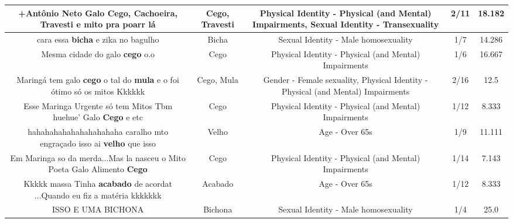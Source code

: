 \documentclass[11pt]{article}
\newlength\mylength
\begin{document}
\begin{center}
\begin{longtable}{|C{.65\mylength}|C{.30\mylength}|C{.12\mylength}|C{.12\mylength}|C{.12\mylength}|}
  \small +Antônio Neto Galo \textbf{Cego}, Cachoeira, \textbf{Travesti} e mito pra poarr lá\normalsize   & Cego, Travesti & Physical Identity - Physical (and Mental) Impairments, Sexual Identity - Transexuality & 2/11 & 18.182 \\  \hline
  \small cara essa \textbf{bicha} e zika no bagulho\normalsize   & Bicha & Sexual Identity - Male homosexuality & 1/7 & 14.286 \\  \hline
  \small Mesma cidade do galo \textbf{cego} o.o\normalsize   & Cego & Physical Identity - Physical (and Mental) Impairments & 1/6 & 16.667 \\  \hline
  \small Maringá tem galo \textbf{cego} o tal do \textbf{mula} e o foi ótimo só os mitos Kkkkkk\normalsize   & Cego, Mula & Gender - Female sexuality, Physical Identity - Physical (and Mental) Impairments & 2/16 & 12.5 \\  \hline
  \small Esse Maringa Urgente só tem Mitos Tbm huehue' Galo \textbf{Cego} e etc\normalsize   & Cego & Physical Identity - Physical (and Mental) Impairments & 1/12 & 8.333 \\  \hline
  \small hahahahahahahahahahaha caralho mto engraçado isso ai \textbf{velho} que isso\normalsize   & Velho & Age - Over 65s & 1/9 & 11.111 \\  \hline
  \small Em Maringa so da merda...Mas la nasceu o Mito Poeta Galo Alimento \textbf{Cego}   \normalsize   & Cego & Physical Identity - Physical (and Mental) Impairments & 1/14 & 7.143 \\  \hline
  \small Kkkkk massa Tinha \textbf{acabado} de acordat ...Quando eu fiz a matéria kkkkkkk\normalsize   & Acabado & Age - Over 65s & 1/12 & 8.333 \\  \hline
  \small ISSO E UMA BICHONA\normalsize   & Bichona & Sexual Identity - Male homosexuality & 1/4 & 25.0 \\  \hline

\end{longtable}
\end{center}
\end{document}
